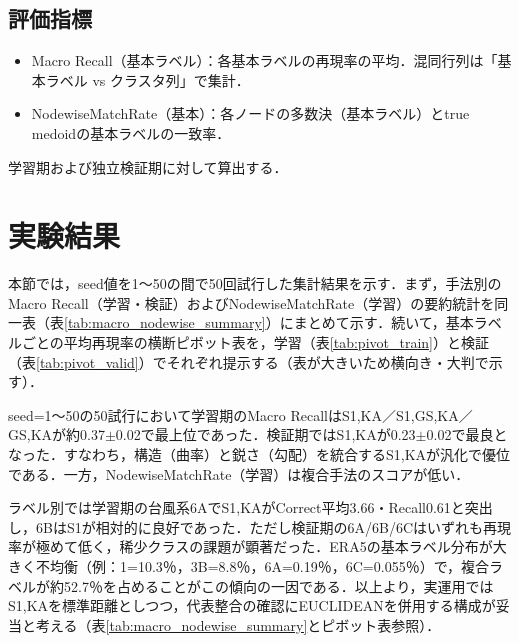 \documentclass{jarticle}
\theoremstyle{definition}
\begin{document}
\subsection{評価指標}
\begin{itemize}
\item Macro Recall（基本ラベル）：各基本ラベルの再現率の平均．混同行列は「基本ラベル vs クラスタ列」で集計．
\item NodewiseMatchRate（基本）：各ノードの多数決（基本ラベル）とtrue medoidの基本ラベルの一致率．
\end{itemize}
学習期および独立検証期に対して算出する．

\section{実験結果}
本節では，seed値を1〜50の間で50回試行した集計結果を示す．まず，手法別のMacro Recall（学習・検証）およびNodewiseMatchRate（学習）の要約統計を同一表（表\ref{tab:macro_nodewise_summary}）にまとめて示す．続いて，基本ラベルごとの平均再現率の横断ピボット表を，学習（表\ref{tab:pivot_train}）と検証（表\ref{tab:pivot_valid}）でそれぞれ提示する（表が大きいため横向き・大判で示す）．

seed=1〜50の50試行において学習期のMacro RecallはS1,KA／S1,GS,KA／GS,KAが約0.37$\pm$0.02で最上位であった．検証期ではS1,KAが0.23$\pm$0.02で最良となった．すなわち，構造（曲率）と鋭さ（勾配）を統合するS1,KAが汎化で優位である．一方，NodewiseMatchRate（学習）は複合手法のスコアが低い．

ラベル別では学習期の台風系6AでS1,KAがCorrect平均3.66・Recall0.61と突出し，6BはS1が相対的に良好であった．ただし検証期の6A/6B/6Cはいずれも再現率が極めて低く，稀少クラスの課題が顕著だった．ERA5の基本ラベル分布が大きく不均衡（例：1=10.3％，3B=8.8％，6A=0.19％，6C=0.055％）で，複合ラベルが約52.7％を占めることがこの傾向の一因である．以上より，実運用ではS1,KAを標準距離としつつ，代表整合の確認にEUCLIDEANを併用する構成が妥当と考える（表\ref{tab:macro_nodewise_summary}とピボット表参照）．
\end{document}
